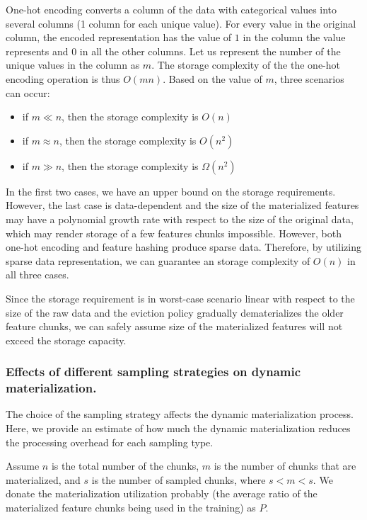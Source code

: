 One-hot encoding converts a column of the data with categorical values into several columns (1 column for each unique value).
For every value in the original column, the encoded representation has the value of $1$ in the column the value represents and $0$ in all the other columns.
Let us represent the number of the unique values in the column as $m$.
The storage complexity of the the one-hot encoding operation is thus $O(mn)$.
Based on the value of $m$, three scenarios can occur:
\begin{itemize}
\item if $m \ll n$, then the storage complexity is $O(n)$
\item if $m \approx n$, then the storage complexity is $O(n^2)$
\item if $m \gg n$, then the storage complexity is $\Omega (n^2)$
\end{itemize}
In the first two cases, we have an upper bound on the storage requirements.
However, the last case is data-dependent and the size of the materialized features may have a polynomial growth rate with respect to the size of the original data, which may render storage of a few features chunks impossible.
However, both one-hot encoding and feature hashing produce sparse data.
Therefore, by utilizing sparse data representation, we can guarantee an storage complexity of $O(n)$ in all three cases.

Since the storage requirement is in worst-case scenario linear with respect to the size of the raw data and the eviction policy gradually dematerializes the older feature chunks, we can safely assume size of the materialized features will not exceed the storage capacity.

\subsubsection{Effects of different sampling strategies on dynamic materialization.}
The choice of the sampling strategy affects the dynamic materialization process.
Here, we provide an estimate of how much the dynamic materialization reduces the processing overhead for each sampling type.

Assume $n$ is the total number of the chunks, $m$ is the number of chunks that are materialized, and $s$ is the number of sampled chunks, where $s < m < s$. 
We donate the materialization utilization probably (the average ratio of the materialized feature chunks being used in the training) as $P$.

